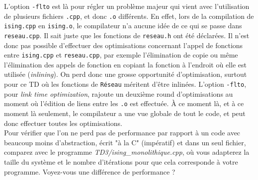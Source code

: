 \documentclass{book}
\newcommand{\inline}[1]{\texttt{#1}}
\def\filename{\emph}
\begin{document}
L'option \inline{-flto} est là pour régler un problème majeur qui vient avec l'utilisation de plusieurs fichiers \texttt{.cpp}, et donc \texttt{.o} différents. En effet, lors de la compilation de \texttt{ising.cpp} en \texttt{ising.o}, le compilateur n'a aucune idée de ce qui se passe dans \texttt{reseau.cpp}. Il sait juste que les fonctions de \texttt{reseau.h} ont été déclarées. Il n'est donc pas possible d'effectuer des optimisations concernant l'appel de fonctions entre \texttt{ising.cpp} et \texttt{reseau.cpp}, par exemple l'élimination de copie ou même l'élimination des appels de fonction en copiant la fonction à l'endroit où elle est utilisée (\emph{inlining}). On perd donc une grosse opportunité d'optimisation, surtout pour ce TD où les fonctions de \inline{Réseau} méritent d'être inlinées. L'option \inline{-flto}, pour \emph{link time optimization}, rajoute un deuxième round d'optimisations au moment où l'édition de liens entre les \texttt{.o} est effectuée. À ce moment là, et à ce moment là seulement, le compilateur a une vue globale de tout le code, et peut donc effectuer toutes les optimisations.\\

Pour vérifier que l'on ne perd pas de performance par rapport à un code avec beaucoup moins d'abstraction, écrit "à la C" (impératif) et dans un seul fichier, comparez avec le programme \filename{TD3/ising\_monolithique.cpp}, où vous adapterez la taille du système et le nombre d'itérations pour que cela corresponde à votre programme. Voyez-vous une différence de performance ?
\end{document}
